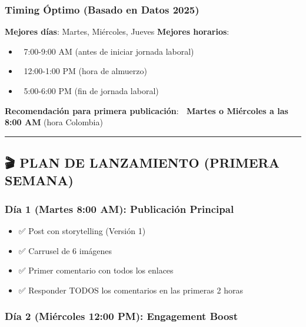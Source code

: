 \documentclass[
]{article}
\providecommand{\tightlist}{%
  \setlength{\itemsep}{0pt}\setlength{\parskip}{0pt}}
\begin{document}
\subsubsection{Timing Óptimo (Basado en Datos
2025)}\label{timing-uxf3ptimo-basado-en-datos-2025}

\textbf{Mejores días}: Martes, Miércoles, Jueves \textbf{Mejores
horarios}:

\begin{itemize}
\tightlist
\item
  🌅 7:00-9:00 AM (antes de iniciar jornada laboral)
\item
  🌆 12:00-1:00 PM (hora de almuerzo)
\item
  🌃 5:00-6:00 PM (fin de jornada laboral)
\end{itemize}

\textbf{Recomendación para primera publicación}: 📅 \textbf{Martes o
Miércoles a las 8:00 AM} (hora Colombia)

\begin{center}\rule{0.5\linewidth}{0.5pt}\end{center}

\subsection{🎬 PLAN DE LANZAMIENTO (PRIMERA
SEMANA)}\label{plan-de-lanzamiento-primera-semana}

\subsubsection{Día 1 (Martes 8:00 AM): Publicación
Principal}\label{duxeda-1-martes-800-am-publicaciuxf3n-principal}

\begin{itemize}
\tightlist
\item
  ✅ Post con storytelling (Versión 1)
\item
  ✅ Carrusel de 6 imágenes
\item
  ✅ Primer comentario con todos los enlaces
\item
  ✅ Responder TODOS los comentarios en las primeras 2 horas
\end{itemize}

\subsubsection{Día 2 (Miércoles 12:00 PM): Engagement
Boost}\label{duxeda-2-miuxe9rcoles-1200-pm-engagement-boost}
\end{document}
